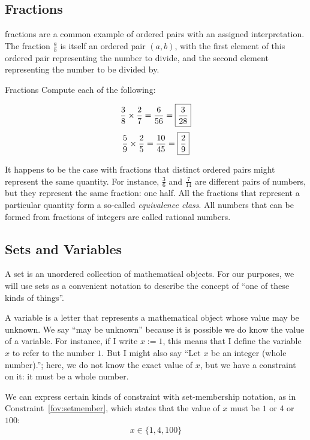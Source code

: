 \documentclass[a4paper,10pt]{report}
\begin{document}
\subsection{Fractions}

\Glspl{fraction} are a common example of ordered pairs with an assigned
interpretation. The fraction \(\frac{a}{b}\) is itself an ordered pair \((a,
b)\), with the first element of this ordered pair representing the number to
divide, and the second element representing the number to be divided by.

\begin{problem}{Fractions}
 Compute each of the following:

 \[
         \frac{3}{8} \times \frac{2}{7} = \frac{6}{56} =
         \Ans{\displaystyle\frac{3}{28}}
        \]
 \[
  \frac{5}{9} \times \frac{2}{5} = \frac{10}{45} =
  \Ans{\displaystyle\frac{2}{9}}
  \]
\end{problem}

It happens to be the case with fractions that distinct ordered pairs might
represent the same quantity. For instance, \(\frac{3}{6}\) and \(\frac{7}{14}\)
are different pairs of numbers, but they represent the same fraction: one half.
All the fractions that represent a particular quantity form a so-called
\emph{equivalence class}. All numbers that can be formed from fractions of
integers are called \glspl{rational number}.

\subsection{Sets and Variables}

A set is an unordered collection of mathematical objects. For our purposes, we will use sets
as a convenient notation to describe the concept of ``one of these kinds of things''.

A variable is a letter that represents a mathematical object whose value may be unknown. We
say ``may be unknown'' because it is possible we do know the value of a variable. For
instance, if I write \(x := 1\), this means that I define the variable \(x\) to refer to the
number \(1\). But I might also say ``Let \(x\) be an integer (whole number).''; here, we do
not know the exact value of \(x\), but we have a constraint on it: it must be a whole
number.

We can express certain kinds of constraint with set-membership notation, as in
Constraint~\ref{fov:setmember}, which states that the value of \(x\) must be \(1\) or \(4\)
or \(100\):
\begin{equation}
  x \in \{1, 4, 100\}
  \label{fov:setmember}
\end{equation}
\end{document}

